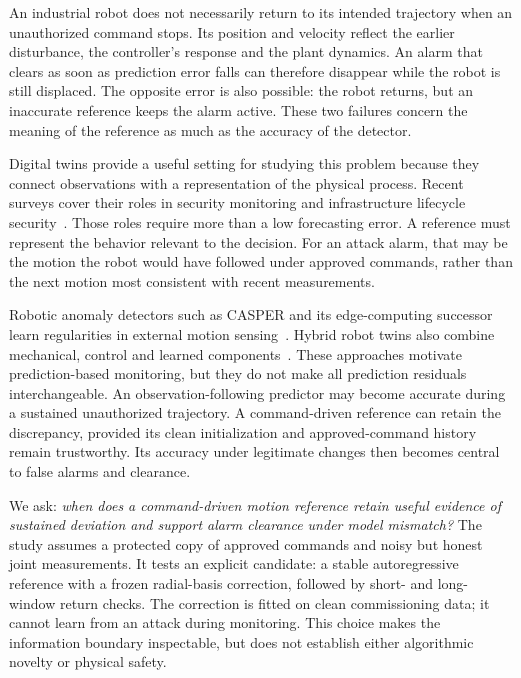 \documentclass[11pt,twocolumn]{article}
\begin{document}
An industrial robot does not necessarily return to its intended trajectory when an unauthorized command stops. Its position and velocity reflect the earlier disturbance, the controller's response and the plant dynamics. An alarm that clears as soon as prediction error falls can therefore disappear while the robot is still displaced. The opposite error is also possible: the robot returns, but an inaccurate reference keeps the alarm active. These two failures concern the meaning of the reference as much as the accuracy of the detector.

Digital twins provide a useful setting for studying this problem because they connect observations with a representation of the physical process. Recent surveys cover their roles in security monitoring and infrastructure lifecycle security~\cite{securitysurvey,lifecycle}. Those roles require more than a low forecasting error. A reference must represent the behavior relevant to the decision. For an attack alarm, that may be the motion the robot would have followed under approved commands, rather than the next motion most consistent with recent measurements.

Robotic anomaly detectors such as CASPER and its edge-computing successor learn regularities in external motion sensing~\cite{casper,edge}. Hybrid robot twins also combine mechanical, control and learned components~\cite{hybrid}. These approaches motivate prediction-based monitoring, but they do not make all prediction residuals interchangeable. An observation-following predictor may become accurate during a sustained unauthorized trajectory. A command-driven reference can retain the discrepancy, provided its clean initialization and approved-command history remain trustworthy. Its accuracy under legitimate changes then becomes central to false alarms and clearance.

We ask: \emph{when does a command-driven motion reference retain useful evidence of sustained deviation and support alarm clearance under model mismatch?} The study assumes a protected copy of approved commands and noisy but honest joint measurements. It tests an explicit candidate: a stable autoregressive reference with a frozen radial-basis correction, followed by short- and long-window return checks. The correction is fitted on clean commissioning data; it cannot learn from an attack during monitoring. This choice makes the information boundary inspectable, but does not establish either algorithmic novelty or physical safety.
\end{document}

